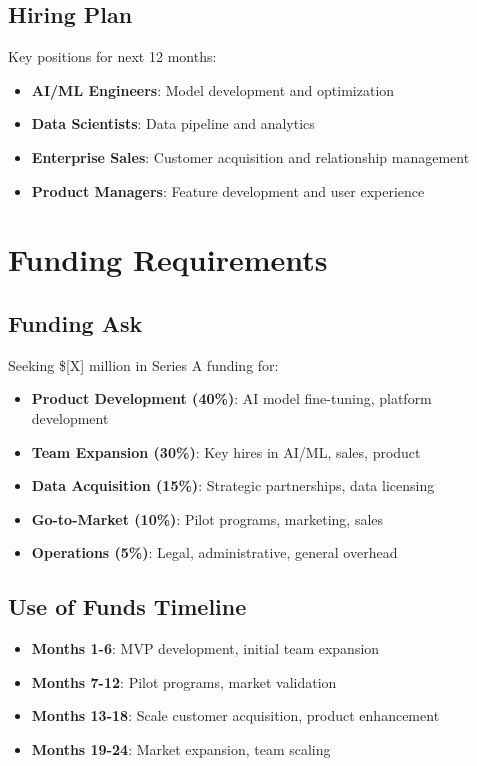 \documentclass[business]{../templates/infraradar-main}
\begin{document}
\subsection{Hiring Plan}
Key positions for next 12 months:
\begin{itemize}
    \item \textbf{AI/ML Engineers}: Model development and optimization
    \item \textbf{Data Scientists}: Data pipeline and analytics
    \item \textbf{Enterprise Sales}: Customer acquisition and relationship management
    \item \textbf{Product Managers}: Feature development and user experience
\end{itemize}

\section{Funding Requirements}

\subsection{Funding Ask}
Seeking \$[X] million in Series A funding for:
\begin{itemize}
    \item \textbf{Product Development (40\%)}: AI model fine-tuning, platform development
    \item \textbf{Team Expansion (30\%)}: Key hires in AI/ML, sales, product
    \item \textbf{Data Acquisition (15\%)}: Strategic partnerships, data licensing
    \item \textbf{Go-to-Market (10\%)}: Pilot programs, marketing, sales
    \item \textbf{Operations (5\%)}: Legal, administrative, general overhead
\end{itemize}

\subsection{Use of Funds Timeline}
\begin{itemize}
    \item \textbf{Months 1-6}: MVP development, initial team expansion
    \item \textbf{Months 7-12}: Pilot programs, market validation
    \item \textbf{Months 13-18}: Scale customer acquisition, product enhancement
    \item \textbf{Months 19-24}: Market expansion, team scaling
\end{itemize}
\end{document}
